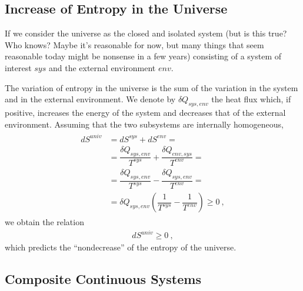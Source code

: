\documentclass[letterpaper,10pt,english]{jupyterBook}
\begin{document}
\subsection{Increase of Entropy in the Universe}
\label{\detokenize{ch/principles-second:increase-of-entropy-in-the-universe}}\label{\detokenize{ch/principles-second:physics-hs-thermodynamics-principles-second-universe}}
\sphinxAtStartPar
If we consider the universe as the closed and isolated system (but is this true? Who knows? Maybe it’s reasonable for now, but many things that seem reasonable today might be nonsense in a few years) consisting of a system of interest \(sys\) and the external environment \(env\).

\sphinxAtStartPar
The variation of entropy in the universe is the sum of the variation in the system and in the external environment. We denote by \(\delta Q_{sys,env}\) the heat flux which, if positive, increases the energy of the system and decreases that of the external environment. Assuming that the two subsystems are internally homogeneous,
\begin{equation*}
\begin{split}\begin{aligned}
d S^{univ} & = d S^{sys} + d S^{env} = \\
           & = \dfrac{\delta Q_{sys,env}}{T^{sys}} + \dfrac{\delta Q_{env,sys}}{T^{env}} = \\
           & = \dfrac{\delta Q_{sys,env}}{T^{sys}} - \dfrac{\delta Q_{sys,env}}{T^{env}} = \\
           & = \delta Q_{sys,env} \left( \dfrac{1}{T^{sys}} - \dfrac{1}{T^{env}} \right) \ge 0 \ ,
\end{aligned}\end{split}
\end{equation*}
\sphinxAtStartPar
we obtain the relation
\begin{equation*}
\begin{split}dS^{univ} \ge 0 \ ,\end{split}
\end{equation*}
\sphinxAtStartPar
which predicts the “non\sphinxhyphen{}decrease” of the entropy of the universe.


\subsection{Composite Continuous Systems}
\label{\detokenize{ch/principles-second:composite-continuous-systems}}\label{\detokenize{ch/principles-second:physics-hs-thermodynamics-principles-second-continuum}}
\sphinxstepscope
\end{document}
